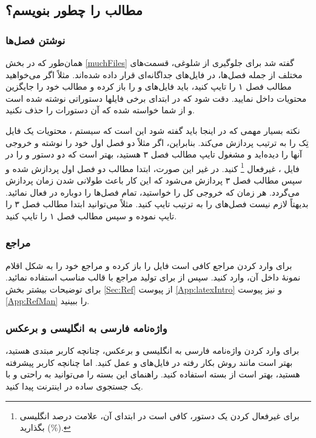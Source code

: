 \subsection[مطالب پایان‌نامه را چطور بنویسم؟]
{مطالب \پ را چطور بنویسم؟}
\subsubsection{نوشتن فصل‌ها}
همان‌طور که در بخش \ref{muchFiles} گفته شد برای جلوگیری از شلوغی، قسمت‌های مختلف \پ از جمله فصل‌ها، در فایل‌های جداگانه‌ای قرار داده شده‌اند. 
مثلاً اگر می‌خواهید مطالب فصل ۱ را تایپ کنید، باید فایل‌های 
و
را باز کرده و مطالب خود را جایگزین محتویات داخل 
نمایید. دقت شود که در ابتدای برخی فایلها دستوراتی نوشته شده است و از شما خواسته شده که آن دستورات را حذف نکنید.


نکته بسیار مهمی که در اینجا باید گفته شود این است که سیستم \lr{\TeX}، محتویات یک فایل تِک را به ترتیب پردازش می‌کند.  بنابراین، اگر مثلاً  دو فصل اول خود را نوشته و خروجی آنها را دیده‌اید و مشغول تایپ مطالب فصل ۳ هستید، بهتر است
که دو دستور 
\verb!!
و
\verb!!
را در فایل 
،
غیرفعال%
\footnote{
برای غیرفعال کردن یک دستور، کافی است در ابتدای آن، علامت درصد انگلیسی (\%) بگذارید.
}
 کنید. در غیر این صورت، ابتدا مطالب دو فصل اول پردازش شده و سپس مطالب فصل ۳ پردازش می‌شود که این کار باعث طولانی شدن زمان پردازش می‌گردد. هر زمان که خروجی کل \پ را خواستید، تمام فصل‌ها را دوباره در
فعال نمائید.
بدیهتاً لازم نیست فصل‌های \پ را به ترتیب تایپ کنید. مثلاً می‌توانید ابتدا مطالب فصل ۳ را تایپ نموده و سپس مطالب فصل ۱ را تایپ کنید. 
\subsubsection{مراجع}
برای وارد کردن مراجع \پ کافی است فایل 
را باز کرده و مراجع خود را به شکل اقلام نمونهٔ داخل آن، وارد کنید.  سپس از  برای تولید مراجع با قالب مناسب استفاده نمائید. برای توضیحات بیشتر بخش \ref{Sec:Ref} از پیوست \ref{App:latexIntro} و نیز پیوست \ref{App:RefMan} را ببینید.

\subsubsection{واژه‌نامه فارسی به انگلیسی و برعکس}
برای وارد کردن واژه‌نامه فارسی به انگلیسی و برعکس، چنانچه کاربر مبتدی هستید، بهتر است مانند روش بکار رفته در فایل‌های 
و
عمل کنید. اما چنانچه کاربر پیشرفته هستید، بهتر است از بسته
استفاده کنید. راهنمای این بسته را می‌توانید به راحتی و با یک جستجوی ساده در اینترنت پیدا کنید.

